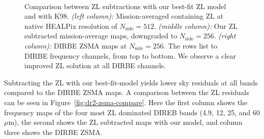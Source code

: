 \documentclass[twocolumn]{aa}
\begin{document}
\begin{figure}
    \\

    \caption{Comparison between ZL subtractions with our best-fit ZL model and with K98. 
    \textit{(left column):} Mission-averaged containing ZL at native HEALPix resolution 
    of $N_\mathrm{side} = 512$. \textit{(middle column):} Our ZL subtracted mission-average 
    maps, downgraded to $N_\mathrm{side} = 256$. \textit{(right column):} DIRBE ZSMA maps
    at $N_\mathrm{side} = 256$. The rows list to DIRBE frequency channels, from top to 
    bottom. We observe a clear improved ZL solution at all DIRBE channels.
    }    
    \label{fig:dr2-zsma-compare2}
\end{figure}

Subtracting the ZL with our best-fit-model yields lower sky residuals at all bands 
compared to the DIRBE ZSMA maps. A comparison between the ZL residuals can be seen 
in Figure~\ref{fig:dr2-zsma-compare}. Here the first column shows the frequency maps of the
four most ZL dominated DIREB bands (4.9, 12, 25, and 60 $\mu$m), the second shows the ZL
subtracted maps with our model, and column three shows the DIRBE ZSMA.
\end{document}
